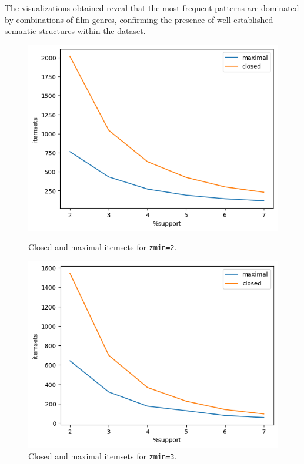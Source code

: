 \documentclass[10pt]{article}
\begin{document}
The visualizations obtained reveal that the most frequent patterns are dominated by combinations of film genres, confirming the presence of well-established semantic structures within the dataset.

\begin{figure}[H]
\centering
\begin{minipage}{0.48\textwidth}
  \includegraphics[width=\linewidth]{zmin2.png}
  \caption{Closed and maximal itemsets for \texttt{zmin=2}.}
  \label{fig:itemset_zmin2}
\end{minipage}
\hfill
\begin{minipage}{0.48\textwidth}
  \includegraphics[width=\linewidth]{zmin3.png}
  \caption{Closed and maximal itemsets for \texttt{zmin=3}.}
  \label{fig:itemset_zmin3}
\end{minipage}
\end{figure}
\end{document}
